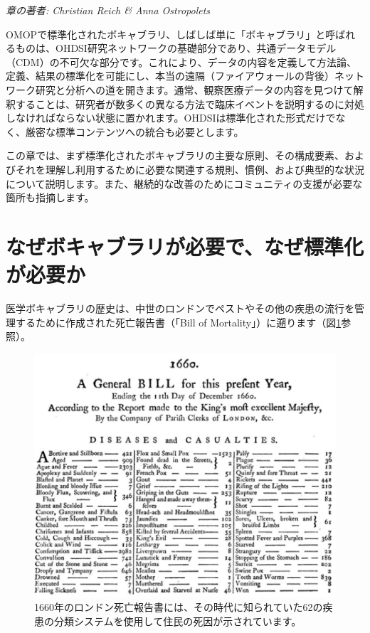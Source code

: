 \documentclass[
  11pt]{book}
\theoremstyle{definition}
\theoremstyle{definition}
\theoremstyle{definition}
\theoremstyle{definition}
\theoremstyle{remark}
\begin{document}

\emph{章の著者: Christian Reich \& Anna Ostropolets}

OMOPで標準化されたボキャブラリ、しばしば単に「ボキャブラリ」と呼ばれるものは、OHDSI研究ネットワークの基礎部分であり、共通データモデル（CDM）の不可欠な部分です。これにより、データの内容を定義して方法論、定義、結果の標準化を可能にし、本当の遠隔（ファイアウォールの背後）ネットワーク研究と分析への道を開きます。通常、観察医療データの内容を見つけて解釈することは、研究者が数多くの異なる方法で臨床イベントを説明するのに対処しなければならない状態に置かれます。OHDSIは標準化された形式だけでなく、厳密な標準コンテンツへの統合も必要とします。

この章では、まず標準化されたボキャブラリの主要な原則、その構成要素、およびそれを理解し利用するために必要な関連する規則、慣例、および典型的な状況について説明します。また、継続的な改善のためにコミュニティの支援が必要な箇所も指摘します。

\section{なぜボキャブラリが必要で、なぜ標準化が必要か}\label{ux306aux305cux30dcux30adux30e3ux30d6ux30e9ux30eaux304cux5fc5ux8981ux3067ux306aux305cux6a19ux6e96ux5316ux304cux5fc5ux8981ux304b}

医学ボキャブラリの歴史は、中世のロンドンでペストやその他の疾患の流行を管理するために作成された死亡報告書（「Bill of Mortality」）に遡ります（図\ref{fig:bill}参照）。

\begin{figure}

{\centering \includegraphics[width=1\linewidth]{images/StandardizedVocabularies/bill} 

}

\caption{1660年のロンドン死亡報告書には、その時代に知られていた62の疾患の分類システムを使用して住民の死因が示されています。}\label{fig:bill}
\end{figure}
\end{document}
